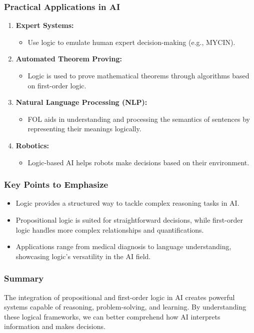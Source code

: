 \documentclass[aspectratio=169]{beamer}
\begin{document}
\begin{frame}[fragile]
    \frametitle{Practical Applications in AI}
    \begin{enumerate}
        \item \textbf{Expert Systems:}
            \begin{itemize}
                \item Use logic to emulate human expert decision-making (e.g., MYCIN).
            \end{itemize}
        \item \textbf{Automated Theorem Proving:}
            \begin{itemize}
                \item Logic is used to prove mathematical theorems through algorithms based on first-order logic.
            \end{itemize}
        \item \textbf{Natural Language Processing (NLP):}
            \begin{itemize}
                \item FOL aids in understanding and processing the semantics of sentences by representing their meanings logically.
            \end{itemize}
        \item \textbf{Robotics:}
            \begin{itemize}
                \item Logic-based AI helps robots make decisions based on their environment.
            \end{itemize}
    \end{enumerate}
\end{frame}

\begin{frame}[fragile]
    \frametitle{Key Points to Emphasize}
    \begin{itemize}
        \item Logic provides a structured way to tackle complex reasoning tasks in AI.
        \item Propositional logic is suited for straightforward decisions, while first-order logic handles more complex relationships and quantifications.
        \item Applications range from medical diagnosis to language understanding, showcasing logic’s versatility in the AI field.
    \end{itemize}
\end{frame}

\begin{frame}[fragile]
    \frametitle{Summary}
    The integration of propositional and first-order logic in AI creates powerful systems capable of reasoning, problem-solving, and learning.
    By understanding these logical frameworks, we can better comprehend how AI interprets information and makes decisions.
\end{frame}
\end{document}
